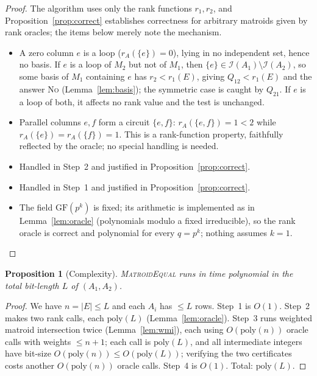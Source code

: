 \documentclass{amsart}
\theoremstyle{plain}
\newtheorem{proposition}{Proposition}
\theoremstyle{definition}
\newcommand{\I}{\mathcal{I}}
\begin{document}
\begin{proof}
The algorithm uses only the rank functions $r_1,r_2$, and Proposition~\ref{prop:correct}
establishes correctness for arbitrary matroids given by rank oracles; the items below merely note
the mechanism.
\begin{itemize}
\item[(i)] A zero column $e$ is a loop ($r_A(\{e\})=0$), lying in no independent set, hence no
basis. If $e$ is a loop of $M_2$ but not of $M_1$, then $\{e\}\in\I(A_1)\setminus\I(A_2)$, so some
basis of $M_1$ containing $e$ has $r_2<r_1(E)$, giving $Q_{12}<r_1(E)$ and the answer \textsc{No}
(Lemma~\ref{lem:basis}); the symmetric case is caught by $Q_{21}$. If $e$ is a loop of both, it
affects no rank value and the test is unchanged.
\item[(ii)] Parallel columns $e,f$ form a circuit $\{e,f\}$: $r_A(\{e,f\})=1<2$ while
$r_A(\{e\})=r_A(\{f\})=1$. This is a rank-function property, faithfully reflected by the oracle;
no special handling is needed.
\item[(iii)] Handled in Step~2 and justified in Proposition~\ref{prop:correct}.
\item[(iv)] Handled in Step~1 and justified in Proposition~\ref{prop:correct}.
\item[(v)] The field $\mathrm{GF}(p^k)$ is fixed; its arithmetic is implemented as in
Lemma~\ref{lem:oracle} (polynomials modulo a fixed irreducible), so the rank oracle is correct and
polynomial for every $q=p^k$; nothing assumes $k=1$. \qedhere
\end{itemize}
\end{proof}

\begin{proposition}[Complexity]\label{prop:complexity}
\textsc{MatroidEqual} runs in time polynomial in the total bit-length $L$ of $(A_1,A_2)$.
\end{proposition}

\begin{proof}
We have $n=|E|\le L$ and each $A_i$ has $\le L$ rows. Step~1 is $O(1)$. Step~2 makes two rank
calls, each $\mathrm{poly}(L)$ (Lemma~\ref{lem:oracle}). Step~3 runs weighted matroid
intersection twice (Lemma~\ref{lem:wmi}), each using $O(\mathrm{poly}(n))$ oracle calls with
weights $\le n+1$; each call is $\mathrm{poly}(L)$, and all intermediate integers have bit-size
$O(\mathrm{poly}(n))\le O(\mathrm{poly}(L))$; verifying the two certificates costs another
$O(\mathrm{poly}(n))$ oracle calls. Step~4 is $O(1)$. Total: $\mathrm{poly}(L)$. \qedhere
\end{proof}
\end{document}

